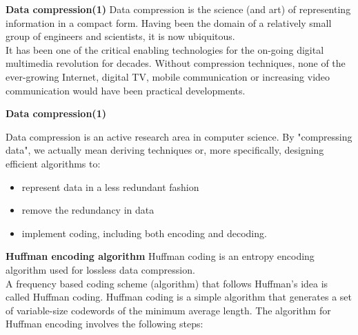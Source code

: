 



{
\noindent \textbf{Data compression(1)}
Data compression is the science (and art) of representing information in a compact form. Having been the domain of a relatively small group of engineers and scientists, it is now ubiquitous. \\ \bigskip It has been one of the critical enabling technologies for the on-going digital multimedia revolution for decades. Without compression techniques, none of the ever-growing Internet, digital TV, mobile communication or increasing video communication would have been practical developments. \\ \bigskip
}
{
\noindent \textbf{Data compression(1)}

Data compression is an active research area in computer science. By "compressing data", we actually mean deriving techniques or, more specifically, designing efficient algorithms to:

\begin{itemize}
\item represent data in a less redundant fashion
\item remove the redundancy in data
\item implement coding, including both encoding and decoding.
\end{itemize}

}






{
\noindent \textbf{Huffman encoding algorithm}
Huffman coding is an entropy encoding algorithm used for lossless data compression.\\
\bigskip
A frequency based coding scheme (algorithm) that follows Huffman's idea is called Huffman coding. Huffman coding is a simple algorithm that generates a set of variable-size codewords of the minimum average length. The algorithm for Huffman encoding involves the following steps:
}


